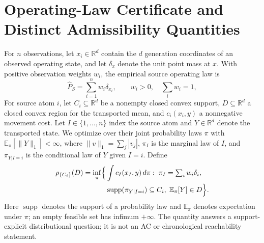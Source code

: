 \documentclass[journal]{IEEEtran}
\DeclareMathOperator{\supp}{supp}
\newcommand{\R}{\mathbb{R}}
\begin{document}
\section{Operating-Law Certificate and Distinct Admissibility Quantities}
For $n$ observations, let $x_i\in\R^d$ contain the $d$ generation coordinates of an observed operating state, and let $\delta_x$ denote the unit point mass at $x$. With positive observation weights $w_i$, the empirical source operating law is
\begin{equation}
\widehat P_S=\sum_{i=1}^{n} w_i\delta_{x_i},\qquad w_i>0,\quad \sum_i w_i=1,
\label{eq:source}
\end{equation}
For source atom $i$, let $C_i\subseteq\R^d$ be a nonempty closed convex support, $D\subseteq\R^d$ a closed convex region for the transported mean, and $c_i(x_i,y)$ a nonnegative movement cost. Let $I\in\{1,\ldots,n\}$ index the source atom and $Y\in\R^d$ denote the transported state. We optimize over their joint probability laws $\pi$ with $\mathbb E_\pi[\|Y\|_1]<\infty$, where $\|v\|_1=\sum_j|v_j|$, $\pi_I$ is the marginal law of $I$, and $\pi_{Y|I=i}$ is the conditional law of $Y$ given $I=i$. Define
\begin{equation}
\begin{aligned}
\rho_{\{C_i\}}(D)=\inf_{\pi}\Bigl\{&\int c_I(x_I,y)\,d\pi:\;\pi_I=\textstyle\sum_iw_i\delta_i,\\
&\supp(\pi_{Y|I=i})\subseteq C_i,\;\mathbb E_\pi[Y]\in D\Bigr\}.
\end{aligned}
\label{eq:rho}
\end{equation}
Here $\supp$ denotes the support of a probability law and $\mathbb E_\pi$ denotes expectation under $\pi$; an empty feasible set has infimum $+\infty$. The quantity answers a support-explicit distributional question; it is not an AC or chronological reachability statement.
\end{document}
